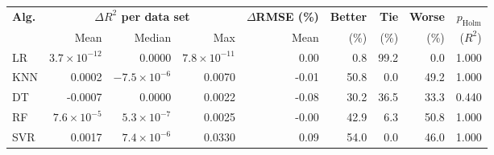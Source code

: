 \begin{tabular}{lrrrrrrrr}
\toprule
\textbf{Alg.} & \multicolumn{3}{c}{\textbf{$\Delta R^2$ per data set}} & \textbf{$\Delta$RMSE (\%)} & \textbf{Better} & \textbf{Tie} & \textbf{Worse} & \textbf{$p_{\text{Holm}}$} \\
\cmidrule(lr){2-4}
& Mean & Median & Max & Mean & (\%) & (\%) & (\%) & ($R^2$) \\
\midrule
LR & $3.7\times10^{-12}$ & 0.0000 & $7.8\times10^{-11}$ & 0.00 & 0.8 & 99.2 & 0.0 & 1.000 \\
KNN & 0.0002 & $-7.5\times10^{-6}$ & 0.0070 & -0.01 & 50.8 & 0.0 & 49.2 & 1.000 \\
DT & -0.0007 & 0.0000 & 0.0022 & -0.08 & 30.2 & 36.5 & 33.3 & 0.440 \\
RF & $7.6\times10^{-5}$ & $5.3\times10^{-7}$ & 0.0025 & -0.00 & 42.9 & 6.3 & 50.8 & 1.000 \\
SVR & 0.0017 & $7.4\times10^{-6}$ & 0.0330 & 0.09 & 54.0 & 0.0 & 46.0 & 1.000 \\
\bottomrule
\end{tabular}
